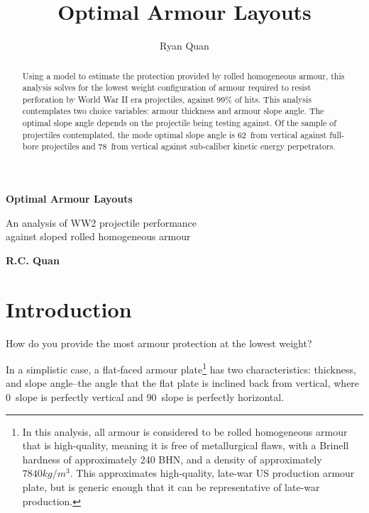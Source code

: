 \documentclass[]{article}
\title{Optimal Armour Layouts}
\author{Ryan Quan}
\begin{document}
\begin{titlepage}
	\begin{center}
		\vspace*{4cm}
		
		\Huge
		\textbf{Optimal Armour Layouts}
		\vspace{0.75cm}
		
		\Large
		An analysis of WW2 projectile performance \\
		against sloped rolled homogeneous armour
		
		\vfill
		\textbf{R.C. Quan}
		\vspace{2cm}
	
		
	\end{center}
\end{titlepage}

\vspace*{4cm}

\begin{abstract}
	\normalsize
	Using a model to estimate the protection provided by rolled homogeneous armour, this analysis solves for the lowest weight configuration of armour required to resist perforation by World War II era projectiles, against 99\% of hits. This analysis contemplates two choice variables: armour thickness and armour slope angle. The optimal slope angle depends on the projectile being testing against. Of the sample of projectiles contemplated, the mode optimal slope angle is 62\degree\ from vertical against full-bore projectiles and 78\degree\ from vertical against sub-caliber kinetic energy perpetrators.
	
\end{abstract}

\vfill

\section{Introduction}
How do you provide the most armour protection at the lowest weight?

In a simplistic case, a flat-faced armour plate\footnote{In this analysis, all armour is considered to be rolled homogeneous armour that is high-quality, meaning it is free of metallurgical flaws, with a Brinell hardness of approximately 240 BHN, and a density of approximately $7840 kg/m^3$. This approximates high-quality, late-war US production armour plate, but is generic enough that it can be representative of  late-war production.} has two characteristics: thickness, and slope angle--the angle that the flat plate is inclined back from vertical, where 0\degree\ slope is perfectly vertical and 90\degree\ slope is perfectly horizontal.
\end{document}
